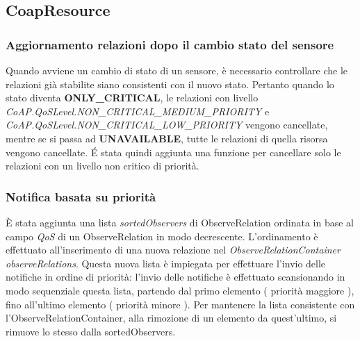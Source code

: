 			\subsection{CoapResource}
				\subsubsection{Aggiornamento relazioni dopo il cambio stato del sensore}\label{cambioStatoSensore}
				Quando avviene un cambio di stato di un sensore, è necessario controllare che le relazioni già stabilite siano consistenti con il nuovo stato. Pertanto quando lo stato diventa \textbf{ONLY\_CRITICAL}, le relazioni con livello \textit{CoAP.QoSLevel.NON\_CRITICAL\_MEDIUM\_PRIORITY} e \textit{CoAP.QoSLevel.NON\_CRITICAL\_LOW\_PRIORITY} vengono cancellate, mentre se si passa ad \textbf{UNAVAILABLE}, tutte le relazioni di quella risorsa vengono cancellate. \'E stata quindi aggiunta una funzione per cancellare solo le relazioni con un livello non critico di priorità. \newline
				
				\subsubsection{Notifica basata su priorità}\label{NotificaPriotita}
				È stata aggiunta una lista \textit{sortedObservers} di ObserveRelation ordinata in base al campo \textit{QoS} di un ObserveRelation in modo decrescente. L’ordinamento è effettuato all’inserimento di una nuova relazione nel \textit{ObserveRelationContainer observeRelations}. Questa nuova lista è impiegata per effettuare l’invio delle notifiche in ordine di priorità: l'invio delle notifiche è effettuato scansionando in modo sequenziale questa lista, partendo dal primo elemento ( priorità maggiore ), fino all'ultimo elemento ( priorità minore ). Per mantenere la lista consistente con l’ObserveRelationContainer, alla rimozione di un elemento da quest’ultimo, si rimuove lo stesso dalla sortedObservers.\newline
				
				
				
				

